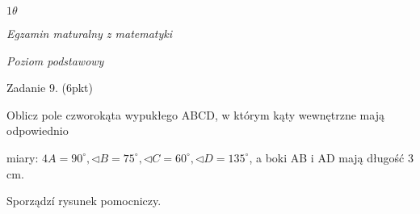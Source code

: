 \documentclass[a4paper,12pt]{article}
\begin{document}
$ 1\theta$

{\it Egzamin maturalny z matematyki}

{\it Poziom podstawowy}

Zadanie 9. (6pkt)

Oblicz pole czworokąta wypukłego ABCD, w którym kąty wewnętrzne mają odpowiednio

miary: $4A=90^{\circ}, \triangleleft B=75^{\circ}, \triangleleft C=60^{\circ}, \triangleleft D=135^{\circ}$, a boki AB $\mathrm{i}$ AD mają długość 3 cm.

Sporządzí rysunek pomocniczy.
\end{document}
